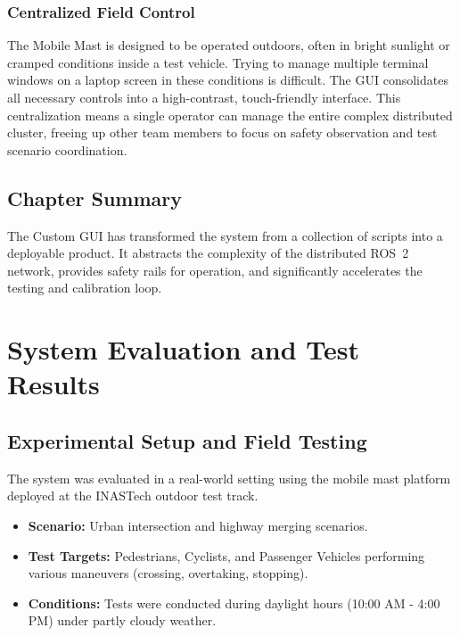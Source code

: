 \documentclass[12pt,a4paper]{report}
\begin{document}
\subsection{Centralized Field Control}
The Mobile Mast is designed to be operated outdoors, often in bright sunlight or cramped conditions inside a test vehicle. Trying to manage multiple terminal windows on a laptop screen in these conditions is difficult. The GUI consolidates all necessary controls into a high-contrast, touch-friendly interface. This centralization means a single operator can manage the entire complex distributed cluster, freeing up other team members to focus on safety observation and test scenario coordination.

\section{Chapter Summary}
The Custom GUI has transformed the system from a collection of scripts into a deployable product. It abstracts the complexity of the distributed ROS~2 network, provides safety rails for operation, and significantly accelerates the testing and calibration loop.

\chapter{System Evaluation and Test Results}

\section{Experimental Setup and Field Testing}
The system was evaluated in a real-world setting using the mobile mast platform deployed at the INASTech outdoor test track.
\begin{itemize}
    \item \textbf{Scenario:} Urban intersection and highway merging scenarios.
    \item \textbf{Test Targets:} Pedestrians, Cyclists, and Passenger Vehicles performing various maneuvers (crossing, overtaking, stopping).
    \item \textbf{Conditions:} Tests were conducted during daylight hours (10:00 AM - 4:00 PM) under partly cloudy weather.
\end{itemize}
\end{document}
